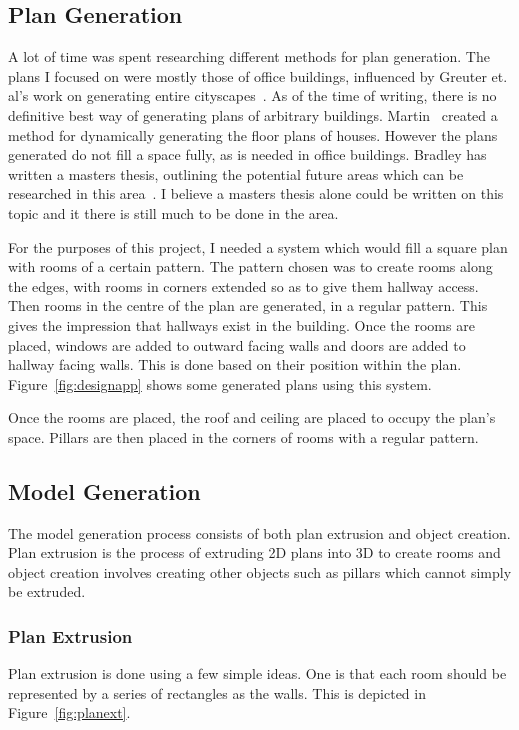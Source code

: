\subsection{Plan Generation}
A lot of time was spent researching different methods for plan generation. 
The plans I focused on were mostly those of office buildings, influenced by Greuter et. al's work on generating entire cityscapes~\cite{greuter2003real}.
As of the time of writing, there is no definitive best way of generating plans of arbitrary buildings.
Martin~\cite{martin2006procedural} created a method for dynamically generating the floor plans of houses.
However the plans generated do not fill a space fully, as is needed in office buildings.
Bradley has written a masters thesis, outlining the potential future areas which can be researched in this area~\cite{bradley2005towards}.
I believe a masters thesis alone could be written on this topic and it there is still much to be done in the area.

For the purposes of this project, I needed a system which would fill a square plan with rooms of a certain pattern.
The pattern chosen was to create rooms along the edges, with rooms in corners extended so as to give them hallway access.
Then rooms in the centre of the plan are generated, in a regular pattern.
This gives the impression that hallways exist in the building.
Once the rooms are placed, windows are added to outward facing walls and doors are added to hallway facing walls.
This is done based on their position within the plan.
Figure~\ref{fig:designapp} shows some generated plans using this system.

Once the rooms are placed, the roof and ceiling are placed to occupy the plan's space.
Pillars are then placed in the corners of rooms with a regular pattern.

\subsection{Model Generation}
The model generation process consists of both plan extrusion and object creation.
Plan extrusion is the process of extruding 2D plans into 3D to create rooms and object creation involves creating other objects such as pillars which cannot simply be extruded.

\subsubsection{Plan Extrusion}
Plan extrusion is done using a few simple ideas.
One is that each room should be represented by a series of rectangles as the walls.
This is depicted in Figure~\ref{fig:planext}.

